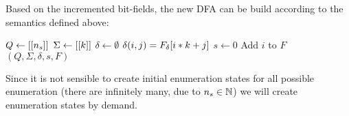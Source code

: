 \noindent Based on the incremented bit-fields, the new DFA can be build according to the semantics defined above:
\vspace{0.2cm}
\begin{algorithmic}[1]
	\State $Q \gets [[{n_s}]]$
	\State $\Sigma \gets [[k]]$
	\State $\delta \gets \emptyset$
            \State $\delta(i, j) = F_\delta[i * k + j]$
		\EndFor
	\EndFor
	\State $s \gets 0$
			\State Add $i$ to $F$
		\EndIf
	\EndFor
	\State \Return $(Q, \Sigma, \delta, s, F)$
	\EndFunction
\end{algorithmic}
\vspace{0.2cm}


\noindent Since it is not sensible to create initial enumeration states for all possible enumeration (there are infinitely many, due to ${n_s}\in\mathbb{N}$) we will create enumeration states by demand.

